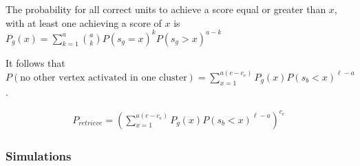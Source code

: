 \documentclass[english,10pt,twocolumn]{IEEEtran}
\renewcommand{\ge}{\geqslant}
\theoremstyle{definition}
\begin{document}
%	
	
	
	The probability for all correct units to achieve a score equal or greater than $x$, with at least one achieving a score of $x$ is $P_g (x) =\sum_{k = 1}^{a} { a \choose k }   P(s_g = x)^k P(s_g > x)^{a-k} $

	It follows that $P(\mbox{no other vertex activated in one cluster})= \sum_{x = 1}^{a (c - c_e)} P_g(x) P(s_b < x)^{\ell-a}$.%
	

	\begin{align}
	P_{retrieve}=  \left( \sum_{x = 1}^{a ( c- c_e)} P_g(x) P(s_b < x)^{\ell-a} \right )^{c_e}
	\label{psi_formula_th}
	\end{align}

	\subsubsection{Simulations}
	
\end{document}
